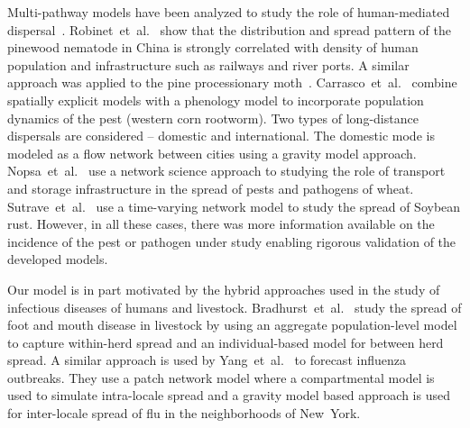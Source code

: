 \documentclass[11pt]{article}
\theoremstyle{definition}
\begin{document}
Multi-pathway models
have been analyzed to study the role of human-mediated
dispersal~\cite{robinet2009role,robinet2012human,carrasco2010unveiling}.
Robinet~et~al.~\cite{robinet2009role} show that the distribution and spread
pattern of the pinewood nematode in China is strongly correlated with
density of human population and infrastructure such as railways and river
ports. A similar approach was applied to the pine processionary
moth~\cite{robinet2012human}.  Carrasco~et~al.~\cite{carrasco2010unveiling}
combine spatially explicit models with a phenology model to incorporate
population dynamics of the pest (western corn rootworm). Two types of
long-distance dispersals are considered -- domestic and international. The
domestic mode is modeled as a flow network between cities using a gravity
model approach. 
Nopsa~et~al.~\cite{nopsa2015ecological} use a network science approach to
studying the role of transport and storage infrastructure in the spread of
pests and pathogens of wheat. Sutrave~et~al.~\cite{sutrave2012identifying}
use a time-varying network model to study the spread of Soybean rust.
However, in all these cases, there was more information available on the
incidence of the pest or pathogen under study enabling rigorous validation of the
developed models.

Our model is in part motivated by the hybrid approaches used in the study
of infectious diseases of humans and livestock.
Bradhurst~et~al.~\cite{bradhurst2015hybrid} study the spread of foot and
mouth disease in livestock by using an aggregate population-level model to
capture within-herd spread and an individual-based model for between herd
spread. A similar approach is used by
Yang~et~al.~\cite{yang2016} to forecast influenza outbreaks. They use a
patch network model where a compartmental model is used to simulate 
intra-locale spread and a gravity model based approach is used for
inter-locale spread of flu in the neighborhoods of New~York.
\end{document}
